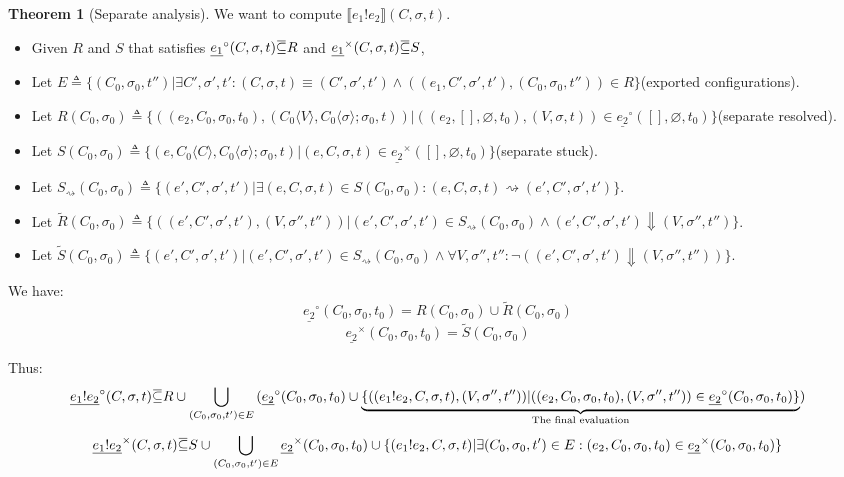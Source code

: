 \documentclass{article}
\theoremstyle{definition}
\newtheorem{thm}{Theorem}[section]
\newcommand{\loverbar}[1]{\mkern 1.5mu\overline{\mkern-1.5mu#1\mkern-1.5mu}\mkern 1.5mu}
\newcommand*{\link}[2]{{#1}\mathtt{!}{#2}}
\newcommand*{\Stuck}[1]{\underline{#1}^{\times}}
\newcommand*{\Resolved}[1]{\underline{#1}^{\circ}}
\newcommand*{\sembracket}[1]{\lBrack{#1}\rBrack}
\newcommand*{\inject}[2]{{#1}\langle{#2}\rangle}
\begin{document}
\begin{thm}[Separate analysis] We want to compute $\sembracket{\link{e_{1}}{e_{2}}}(C,\sigma,t)$.
  $\:$

  \begin{itemize}
    \item Given $R$ and $S$ that satisfies $\Resolved{e_{1}}(C,\sigma,t)\loverbar{\subseteq} R$ and $\Stuck{e_{1}}(C,\sigma,t)\loverbar{\subseteq} S$,
    \item Let $E\triangleq\{(C_{0},\sigma_{0},t'')|\exists C',\sigma',t':(C,\sigma,t)\equiv(C',\sigma',t')\wedge((e_{1},C',\sigma',t'),(C_{0},\sigma_{0},t''))\in R\}$(exported configurations).
    \item Let $R(C_{0},\sigma_{0})\triangleq\{((e_{2},C_{0},\sigma_{0},t_{0}), (\inject{C_{0}}{V},\inject{C_{0}}{\sigma};\sigma_{0},t))|((e_{2},[],\varnothing,t_{0}),(V,\sigma,t))\in\Resolved{e_{2}}([],\varnothing,t_{0})\}$(separate resolved).
    \item Let $S(C_{0},\sigma_{0})\triangleq\{(e,\inject{C_{0}}{C},\inject{C_{0}}{\sigma};\sigma_{0},t)|(e,C,\sigma,t)\in\Stuck{e_{2}}([],\varnothing,t_{0})\}$(separate stuck).
    \item Let ${S}_{\rightsquigarrow}(C_{0},\sigma_{0})\triangleq\{(e',C',\sigma',t')|\exists(e,C,\sigma,t)\in S(C_{0},\sigma_{0}):(e,C,\sigma,t)\rightsquigarrow(e',C',\sigma',t')\}$.
    \item Let $\tilde{R}(C_{0},\sigma_{0})\triangleq\{((e',C',\sigma',t'), (V,\sigma'',t''))|(e',C',\sigma',t')\in{S}_{\rightsquigarrow}(C_{0},\sigma_{0})\wedge(e',C',\sigma',t')\Downarrow(V,\sigma'',t'')\}$.
    \item Let $\tilde{S}(C_{0},\sigma_{0})\triangleq\{(e',C',\sigma',t')|(e',C',\sigma',t')\in S_{\rightsquigarrow}(C_{0},\sigma_{0})\wedge\forall V,\sigma'',t'':\lnot((e',C',\sigma',t')\Downarrow(V,\sigma'',t''))\}$.
  \end{itemize}

  We have:
  \[
    \Resolved{e_{2}}(C_{0},\sigma_{0},t_{0})=R(C_{0},\sigma_{0})\cup\tilde{R}(C_{0},\sigma_{0})
  \]
  \[
    \Stuck{e_{2}}(C_{0},\sigma_{0},t_{0})=\tilde{S}(C_{0},\sigma_{0})
  \]

  Thus:
  \[
    \Resolved{\link{e_1}{e_2}}(C,\sigma,t)\loverbar{\subseteq}
    R\cup\bigcup_{(C_{0},\sigma_{0},t')\in E}{(\Resolved{e_2}(C_{0},\sigma_{0},t_{0})\cup\underbrace{\{((\link{e_1}{e_2}, C, \sigma, t), (V,\sigma'',t''))|((e_{2},C_{0},\sigma_{0},t_{0}),(V,\sigma'',t''))\in\Resolved{e_{2}}(C_{0},\sigma_{0},t_{0})\}}_{\text{The final evaluation}})}
  \]
  \[
    \Stuck{\link{e_1}{e_2}}(C,\sigma,t)\loverbar{\subseteq}S\cup\bigcup_{(C_{0},\sigma_{0},t')\in E}{\Stuck{e_2}(C_{0},\sigma_{0},t_{0})}\cup \{(\link{e_1}{e_2}, C, \sigma, t)|\exists (C_{0},\sigma_{0},t')\in E:(e_{2},C_{0},\sigma_{0},t_{0})\in\Stuck{e_{2}}(C_{0},\sigma_{0},t_{0})\}
  \]
\end{thm}
\end{document}
